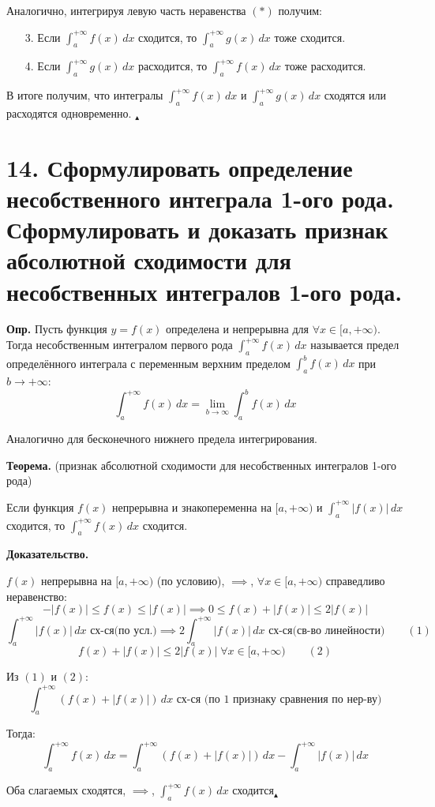 \documentclass[11pt]{article}
\begin{document}
\par Аналогично, интегрируя левую часть неравенства $(*)$ получим:
\begin{enumerate}
\item[3.] Если $\int_{a}^{+\infty} f(x) \, dx$ сходится, то $\int_{a}^{+\infty} g(x) \, dx$ тоже сходится.
\item[4.] Если $\int_{a}^{+\infty} g(x) \, dx$ расходится, то $\int_{a}^{+\infty} f(x) \, dx$ тоже расходится.
\end{enumerate}
\par В итоге получим, что интегралы $\int_{a}^{+\infty} f(x) \, dx$ и $\int_{a}^{+\infty} g(x) \, dx$ сходятся или расходятся одновременно. $_\blacktriangle$

\section*{14. Сформулировать определение несобственного интеграла 1-ого рода. Сформулировать и доказать признак абсолютной сходимости для несобственных интегралов 1-ого рода.}
\par\textbf{Опр.} Пусть функция $y = f(x)$ определена и непрерывна для $\forall x \in [a, +\infty)$. Тогда несобственным интегралом первого рода $\int_{a}^{+\infty} f(x) \, dx$ называется предел определённого интеграла с переменным верхним пределом $\int_{a}^{b} f(x) \, dx$ при $b \to +\infty$:$$\int_{a}^{+\infty} f(x) \, dx = \lim_{ b \to \infty}{\int_{a}^b f(x) \, dx }$$
\par Аналогично для бесконечного нижнего предела интегрирования.
\par\textbf{Теорема.} (признак абсолютной сходимости для несобственных интегралов 1-ого рода)
\par Если функция $f(x)$ непрерывна и знакопеременна на $[a, +\infty)$ и $\int_{a}^{+\infty} |f(x)| \, dx$ сходится, то $\int_{a}^{+\infty} f(x) \, dx$ сходится.
\par\textbf{Доказательство.}
\par $f(x)$ непрерывна на $[a, +\infty)$ (по условию), $\implies$, $\forall x \in [a, +\infty)$ справедливо неравенство: $$-|f(x)| \leq f(x) \leq |f(x)| \implies 0 \leq f(x) + |f(x)| \leq 2 |f(x)|$$
$$\int_{a}^{+\infty} |f(x)| \, dx \text{ сх-ся(по усл.)} \implies 2\int_{a}^{+\infty} |f(x)| \, dx \text{ сх-ся(св-во линейности)} \qquad (1)$$
$$f(x) + |f(x)| \leq 2 |f(x)| \; \forall x \in [a, +\infty) \qquad (2)$$
\par Из $(1)$ и $(2)$: $$\int_{a}^{+\infty} (f(x) + |f(x)|) \, dx \text{ сх-ся (по 1 признаку сравнения по нер-ву)}$$
\par Тогда:$$\int_{a}^{+\infty} f(x) \, dx = \int_{a}^{+\infty} (f(x) + |f(x)|) \, dx - \int_{a}^{+\infty} |f(x)| \, dx$$
\par Оба слагаемых сходятся, $\implies$, $\int_{a}^{+\infty} f(x) \, dx$ сходится$_{\blacktriangle}$
\end{document}

